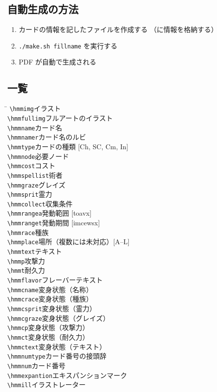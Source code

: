 \documentclass[line_length=22zw,number_of_lines=45,twocolumn]{jlreq}
\begin{document}
\subsection{自動生成の方法}
\begin{enumerate}
	\item カードの情報を記したファイルを作成する
		（に情報を格納する）
	\item \texttt{./make.sh fillname} を実行する
	\item PDF が自動で生成される
\end{enumerate}

\subsection{一覧}
\begin{tabbing}
	\hspace{.4\linewidth}\=\kill
	\verb+\hmmimg+\>イラスト\\
	\verb+\hmmfullimg+\>フルアートのイラスト\\
	\verb+\hmmname+\>カード名\\
	\verb+\hmmnamer+\>カード名のルビ\\
	\verb+\hmmtype+\>カードの種類 [Ch, SC, Cm, In]\\
	\verb+\hmmnode+\>必要ノード\\
	\verb+\hmmcost+\>コスト\\
	\verb+\hmmspellist+\>術者\\
	\verb+\hmmgraze+\>グレイズ\\
	\verb+\hmmsprit+\>霊力\\
	\verb+\hmmcollect+\>収集条件\\
	\verb+\hmmrangea+\>発動範囲 [toavx]\\
	\verb+\hmmranget+\>発動期間 [imcewsx]\\
	\verb+\hmmrace+\>種族\\
	\verb+\hmmplace+\>場所（複数には未対応）[A--L]\\
	\verb+\hmmtext+\>テキスト\\
	\verb+\hmmp+\>攻撃力\\
	\verb+\hmmt+\>耐久力\\
	\verb+\hmmflavor+\>フレーバーテキスト\\
	\verb+\hmmcname+\>変身状態（名称）\\
	\verb+\hmmcrace+\>変身状態（種族）\\
	\verb+\hmmcsprit+\>変身状態（霊力）\\
	\verb+\hmmcgraze+\>変身状態（グレイズ）\\
	\verb+\hmmcp+\>変身状態（攻撃力）\\
	\verb+\hmmct+\>変身状態（耐久力）\\
	\verb+\hmmctext+\>変身状態（テキスト）\\
	\verb+\hmmnumtype+\>カード番号の接頭辞\\
	\verb+\hmmnum+\>カード番号\\
	\verb+\hmmexpantion+\>エキスパンションマーク\\
	\verb+\hmmill+\>イラストレーター\\
\end{tabbing}
\end{document}
